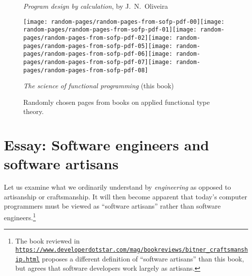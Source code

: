 \begin{figure}
\begin{centering}
\emph{Program design by calculation}, by J.~N.~Oliveira
\par\end{centering}
\begin{centering}
\vspace{1\baselineskip}
\par\end{centering}
\begin{centering}
\texttt{[image: random-pages/random-pages-from-sofp-pdf-00]}\texttt{[image: random-pages/random-pages-from-sofp-pdf-01]}\texttt{[image: random-pages/random-pages-from-sofp-pdf-02]}\texttt{[image: random-pages/random-pages-from-sofp-pdf-05]}\texttt{[image: random-pages/random-pages-from-sofp-pdf-06]}\texttt{[image: random-pages/random-pages-from-sofp-pdf-07]}\texttt{[image: random-pages/random-pages-from-sofp-pdf-08]}
\par\end{centering}
\vspace{-0.3\baselineskip}

\begin{centering}
\emph{The science of functional programming} (this book)
\par\end{centering}
\vspace{1\baselineskip}

\caption{Randomly chosen pages from books on applied functional type theory.\label{fig:Randomly-chosen-pages}}
\end{figure}


\chapter{Essay: Software engineers and software artisans}

Let us examine what we ordinarily understand by \emph{engineering}
as opposed to artisanship or craftsmanship. It will then become apparent
that today\textsf{'}s computer programmers must be viewed as \textsf{``}software artisans\textsf{''}
rather than software engineers.\footnote{The book reviewed in \texttt{\href{https://www.developerdotstar.com/mag/bookreviews/bitner_craftsmanship.html}{https://www.developerdotstar.com/mag/bookreviews/bitner\_craftsmanship.html}}
proposes a different definition of \textsf{``}software artisans\textsf{''} than this
book, but agrees that software developers work largely as artisans.}

